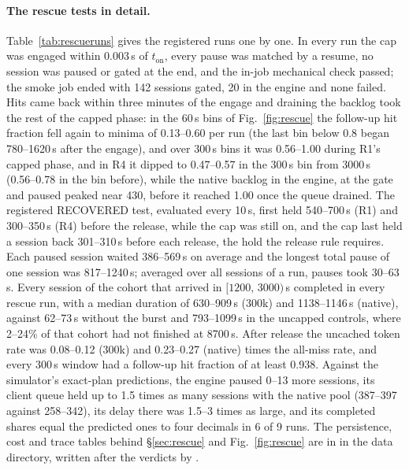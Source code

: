 \paragraph{The rescue tests in detail.}\label{app:rescue}
Table~\ref{tab:rescueruns} gives the registered runs one by one. In every run the cap was engaged within 0.003\,s of $t_{\mathrm{on}}$, every pause was matched by a resume, no session was paused or gated at the end, and the in-job mechanical check passed; the smoke job ended with 142 sessions gated, 20 in the engine and none failed. Hits came back within three minutes of the engage and draining the backlog took the rest of the capped phase: in the 60\,s bins of Fig.~\ref{fig:rescue} the follow-up hit fraction fell again to minima of 0.13--0.60 per run (the last bin below 0.8 began 780--1620\,s after the engage), and over 300\,s bins it was 0.56--1.00 during R1's capped phase, and in R4 it dipped to 0.47--0.57 in the 300\,s bin from 3000\,s (0.56--0.78 in the bin before), while the native backlog in the engine, at the gate and paused peaked near 430, before it reached 1.00 once the queue drained. The registered RECOVERED test, evaluated every 10\,s, first held 540--700\,s (R1) and 300--350\,s (R4) before the release, while the cap was still on, and the cap last held a session back 301--310\,s before each release, the hold the release rule requires. Each paused session waited 386--569\,s on average and the longest total pause of one session was 817--1240\,s; averaged over all sessions of a run, pauses took 30--63\,s. Every session of the cohort that arrived in $[1200,\,3000)$\,s completed in every rescue run, with a median duration of 630--909\,s (300k) and 1138--1146\,s (native), against 62--73\,s without the burst and 793--1099\,s in the uncapped controls, where 2--24\% of that cohort had not finished at 8700\,s. After release the uncached token rate was 0.08--0.12 (300k) and 0.23--0.27 (native) times the all-miss rate, and every 300\,s window had a follow-up hit fraction of at least 0.938. Against the simulator's exact-plan predictions, the engine paused 0--13 more sessions, its client queue held up to 1.5 times as many sessions with the native pool (387--397 against 258--342), its delay there was 1.5--3 times as large, and its completed shares equal the predicted ones to four decimals in 6 of 9 runs. The persistence, cost and trace tables behind \S\ref{sec:rescue} and Fig.~\ref{fig:rescue} are in  in the data directory, written after the verdicts by .

